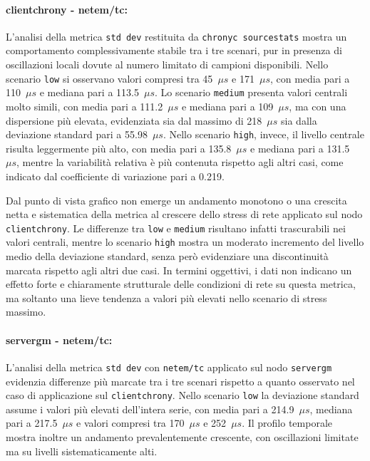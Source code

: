 \paragraph*{clientchrony - netem/tc:}
L’analisi della metrica \texttt{std dev} restituita da \texttt{chronyc
sourcestats} mostra un comportamento complessivamente stabile tra i tre scenari, pur
in presenza di oscillazioni locali dovute al numero limitato di campioni disponibili.
Nello scenario \texttt{low} si osservano valori compresi tra 45~$\mu s$ e 171~$\mu
s$, con media pari a 110~$\mu s$ e mediana pari a 113.5~$\mu s$. Lo scenario \texttt{medium}
presenta valori centrali molto simili, con media pari a 111.2~$\mu s$ e mediana pari
a 109~$\mu s$, ma con una dispersione più elevata, evidenziata sia dal massimo di
218~$\mu s$ sia dalla deviazione standard pari a 55.98~$\mu s$. Nello scenario
\texttt{high}, invece, il livello centrale risulta leggermente più alto, con
media pari a 135.8~$\mu s$ e mediana pari a 131.5~$\mu s$, mentre la variabilità relativa
è più contenuta rispetto agli altri casi, come indicato dal coefficiente di
variazione pari a 0.219.

Dal punto di vista grafico non emerge un andamento monotono o una crescita netta
e sistematica della metrica al crescere dello stress di rete applicato sul nodo
\texttt{clientchrony}. Le differenze tra \texttt{low} e \texttt{medium}
risultano infatti trascurabili nei valori centrali, mentre lo scenario \texttt{high}
mostra un moderato incremento del livello medio della deviazione standard, senza però
evidenziare una discontinuità marcata rispetto agli altri due casi. In termini
oggettivi, i dati non indicano un effetto forte e chiaramente strutturale delle condizioni
di rete su questa metrica, ma soltanto una lieve tendenza a valori più elevati
nello scenario di stress massimo.

\paragraph*{servergm - netem/tc:}
L’analisi della metrica \texttt{std dev} con \texttt{netem/tc} applicato sul nodo
\texttt{servergm} evidenzia differenze più marcate tra i tre scenari rispetto a
quanto osservato nel caso di applicazione sul \texttt{clientchrony}. Nello
scenario \texttt{low} la deviazione standard assume i valori più elevati dell’intera
serie, con media pari a 214.9~$\mu s$, mediana pari a 217.5~$\mu s$ e valori compresi
tra 170~$\mu s$ e 252~$\mu s$. Il profilo temporale mostra inoltre un andamento
prevalentemente crescente, con oscillazioni limitate ma su livelli sistematicamente
alti.

